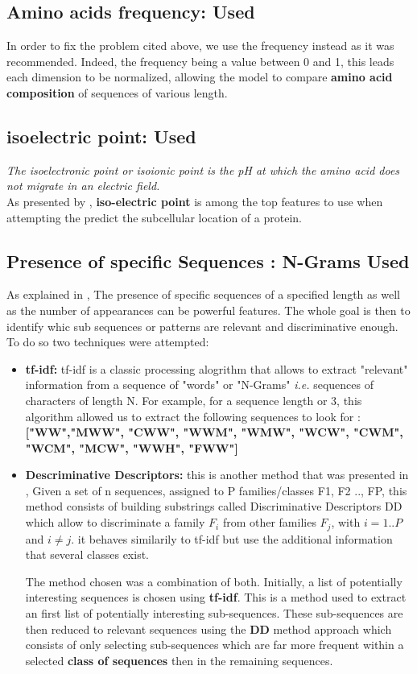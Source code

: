 \documentclass{bioinfo}
\begin{document}
\subsection{Amino acids frequency: \textbf{Used}}
In order  to fix the problem cited above, we use the frequency instead as it was recommended. Indeed, the frequency being a value between 0 and 1, this leads each dimension to be normalized, allowing the model to compare \textbf{amino acid composition} of sequences of various length.

\subsection{isoelectric point: \textbf{Used}}
\textit{The isoelectronic point or isoionic point is the pH at which the amino acid does not migrate in an electric field.} \\
As presented by \cite{gao05}, \textbf{iso-electric point} is among the top features to use when attempting the predict the subcellular location of a protein.

\subsection{Presence of specific Sequences : N-Grams \textbf{Used}}

As explained in \cite{Saidi2010}, The presence of specific sequences of a specified length as well as the number of appearances can be powerful features. The whole goal is then to identify whic sub sequences or patterns are relevant and discriminative enough.\\
To do so two techniques were attempted: 
\begin{itemize}
	\item \textbf{tf-idf: } tf-idf is a classic processing alogrithm that allows to extract "relevant" information from a sequence of "words" or "N-Grams" \textit{i.e.} sequences of characters of length N. For example, for a sequence length or 3, this algorithm allowed us to extract the following sequences to look for : \textbf{["WW","MWW", "CWW", "WWM", "WMW", "WCW", "CWM", "WCM", "MCW", "WWH", "FWW"]}
	\item \textbf{Descriminative Descriptors: } this is another method that was presented in \cite{Saidi2010}, Given a set of n sequences, assigned to P families/classes F1, F2 .., FP, this method consists of building substrings called Discriminative Descriptors DD which allow to discriminate a family $F_i$ from other families $F_j$, with $i = 1..P$ and $i \neq j$. it behaves similarily to tf-idf but use the additional information that several classes exist. 

	The method chosen was a combination of both. Initially, a list of potentially interesting sequences is chosen using \textbf{tf-idf}. This is a method used to extract an first list of potentially interesting sub-sequences. These sub-sequences are then reduced to relevant sequences using the \textbf{DD} method approach which consists of only selecting sub-sequences which are far more frequent within a selected \textbf{class of sequences} then in the remaining sequences.

\end{itemize}
\end{document}
